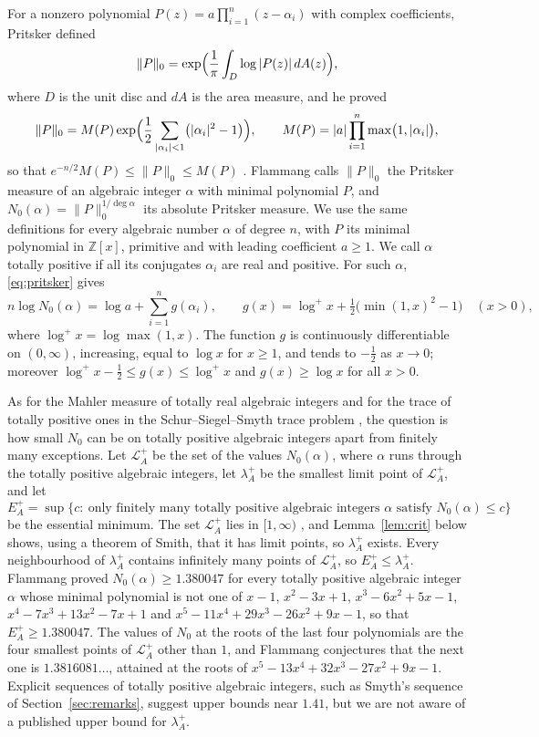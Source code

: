 \documentclass[11pt]{amsart}
\theoremstyle{remark}
\numberwithin{equation}{section}
\newcommand{\Z}{\mathbb{Z}}
\newcommand{\logp}{\log^{+}}
\newcommand{\FlamVal}{1.380047}
\newcommand{\FlamNext}{1.3816081}
\begin{document}
For a nonzero polynomial $P(z)=a\prod_{i=1}^n(z-\alpha_i)$ with complex coefficients, Pritsker \cite{Pri08} defined
\[
\|P\|_0=\exp\Bigl(\frac1\pi\int_{D}\log|P(z)|\,dA(z)\Bigr),
\]
where $D$ is the unit disc and $dA$ is the area measure, and he proved
\begin{equation}\label{eq:pritsker}
\|P\|_0=M(P)\exp\Bigl(\frac12\sum_{|\alpha_i|<1}\bigl(|\alpha_i|^2-1\bigr)\Bigr),\qquad M(P)=|a|\prod_{i=1}^n\max\bigl(1,|\alpha_i|\bigr),
\end{equation}
so that $e^{-n/2}M(P)\le\|P\|_0\le M(P)$ \cite[Theorem~1.1 and Corollary~1.2]{Pri08}. Flammang \cite{Fla15} calls $\|P\|_0$ the Pritsker measure of an algebraic integer $\alpha$ with minimal polynomial $P$, and $N_0(\alpha)=\|P\|_0^{1/\deg\alpha}$ its absolute Pritsker measure. We use the same definitions for every algebraic number $\alpha$ of degree $n$, with $P$ its minimal polynomial in $\Z[x]$, primitive and with leading coefficient $a\ge1$. We call $\alpha$ totally positive if all its conjugates $\alpha_i$ are real and positive. For such $\alpha$, \eqref{eq:pritsker} gives
\begin{equation}\label{eq:height}
n\log N_0(\alpha)=\log a+\sum_{i=1}^ng(\alpha_i),\qquad g(x)=\logp x+\tfrac12\bigl(\min(1,x)^2-1\bigr)\quad(x>0),
\end{equation}
where $\logp x=\log\max(1,x)$. The function $g$ is continuously differentiable on $(0,\infty)$, increasing, equal to $\log x$ for $x\ge1$, and tends to $-\frac12$ as $x\to0$; moreover $\logp x-\frac12\le g(x)\le\logp x$ and $g(x)\ge\log x$ for all $x>0$.

As for the Mahler measure of totally real algebraic integers \cite{Smy80,Smy81} and for the trace of totally positive ones in the Schur--Siegel--Smyth trace problem \cite{OSS25}, the question is how small $N_0$ can be on totally positive algebraic integers apart from finitely many exceptions. Let $\mathcal L_{A}^+$ be the set of the values $N_0(\alpha)$, where $\alpha$ runs through the totally positive algebraic integers, let $\lambda_A^+$ be the smallest limit point of $\mathcal L_A^+$, and let
\[
E_A^+=\sup\bigl\{c:\ \text{only finitely many totally positive algebraic integers $\alpha$ satisfy $N_0(\alpha)\le c$}\bigr\}
\]
be the essential minimum. The set $\mathcal L_A^+$ lies in $[1,\infty)$ \cite[(1.3)]{Pri08}, and Lemma~\ref{lem:crit} below shows, using a theorem of Smith, that it has limit points, so $\lambda_A^+$ exists. Every neighbourhood of $\lambda_A^+$ contains infinitely many points of $\mathcal L_A^+$, so $E_A^+\le\lambda_A^+$. Flammang \cite[Theorem~2]{Fla15} proved $N_0(\alpha)\ge\FlamVal$ for every totally positive algebraic integer $\alpha$ whose minimal polynomial is not one of $x-1$, $x^2-3x+1$, $x^3-6x^2+5x-1$, $x^4-7x^3+13x^2-7x+1$ and $x^5-11x^4+29x^3-26x^2+9x-1$, so that $E_A^+\ge\FlamVal$. The values of $N_0$ at the roots of the last four polynomials are the four smallest points of $\mathcal L_A^+$ other than $1$, and Flammang conjectures that the next one is $\FlamNext\ldots$, attained at the roots of $x^5-13x^4+32x^3-27x^2+9x-1$. Explicit sequences of totally positive algebraic integers, such as Smyth's sequence of Section~\ref{sec:remarks}, suggest upper bounds near $1.41$, but we are not aware of a published upper bound for $\lambda_A^+$.
\end{document}
